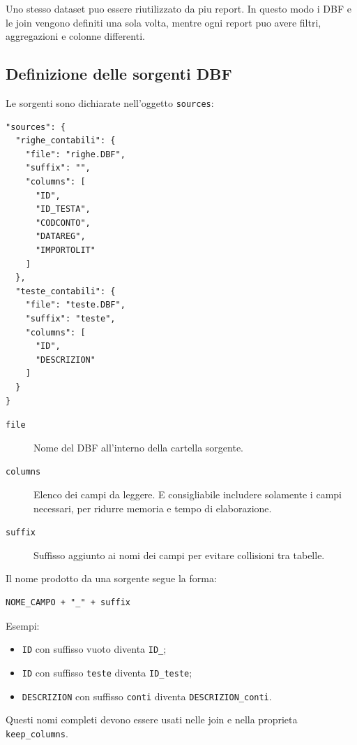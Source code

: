 Uno stesso dataset puo essere riutilizzato da piu report. In questo modo i
DBF e le join vengono definiti una sola volta, mentre ogni report puo avere
filtri, aggregazioni e colonne differenti.

\subsection{Definizione delle sorgenti DBF}

Le sorgenti sono dichiarate nell'oggetto \texttt{sources}:

\begin{lstlisting}
"sources": {
  "righe_contabili": {
    "file": "righe.DBF",
    "suffix": "",
    "columns": [
      "ID",
      "ID_TESTA",
      "CODCONTO",
      "DATAREG",
      "IMPORTOLIT"
    ]
  },
  "teste_contabili": {
    "file": "teste.DBF",
    "suffix": "teste",
    "columns": [
      "ID",
      "DESCRIZION"
    ]
  }
}
\end{lstlisting}

\begin{description}
  \item[\texttt{file}]
  Nome del DBF all'interno della cartella sorgente.

  \item[\texttt{columns}]
  Elenco dei campi da leggere. E consigliabile includere solamente i campi
  necessari, per ridurre memoria e tempo di elaborazione.

  \item[\texttt{suffix}]
  Suffisso aggiunto ai nomi dei campi per evitare collisioni tra tabelle.
\end{description}

Il nome prodotto da una sorgente segue la forma:

\begin{lstlisting}
NOME_CAMPO + "_" + suffix
\end{lstlisting}

Esempi:

\begin{itemize}
  \item \texttt{ID} con suffisso vuoto diventa \texttt{ID\_};
  \item \texttt{ID} con suffisso \texttt{teste} diventa
        \texttt{ID\_teste};
  \item \texttt{DESCRIZION} con suffisso \texttt{conti} diventa
        \texttt{DESCRIZION\_conti}.
\end{itemize}

Questi nomi completi devono essere usati nelle join e nella proprieta
\texttt{keep\_columns}.

